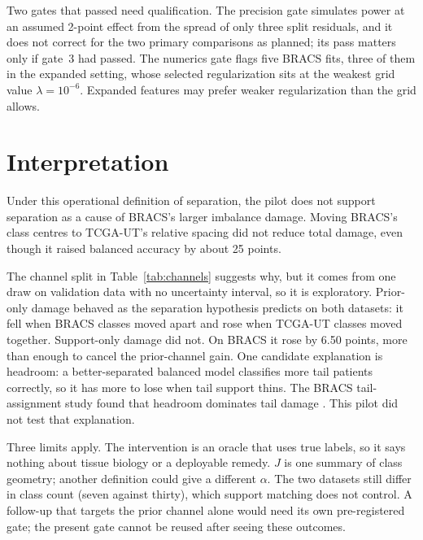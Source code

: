 \documentclass[11pt]{article}
\begin{document}
\noindent Two gates that passed need qualification. The precision gate simulates power at an assumed 2-point effect from the spread of only three split residuals, and it does not correct for the two primary comparisons as planned; its pass matters only if gate~3 had passed. The numerics gate flags five BRACS fits, three of them in the expanded setting, whose selected regularization sits at the weakest grid value $\lambda = 10^{-6}$. Expanded features may prefer weaker regularization than the grid allows.

\section{Interpretation}
\label{sec:interpretation}
Under this operational definition of separation, the pilot does not support separation as a cause of BRACS's larger imbalance damage. Moving BRACS's class centres to TCGA-UT's relative spacing did not reduce total damage, even though it raised balanced accuracy by about 25 points.

The channel split in Table~\ref{tab:channels} suggests why, but it comes from one draw on validation data with no uncertainty interval, so it is exploratory. Prior-only damage behaved as the separation hypothesis predicts on both datasets: it fell when BRACS classes moved apart and rose when TCGA-UT classes moved together. Support-only damage did not. On BRACS it rose by 6.50 points, more than enough to cancel the prior-channel gain. One candidate explanation is headroom: a better-separated balanced model classifies more tail patients correctly, so it has more to lose when tail support thins. The BRACS tail-assignment study found that headroom dominates tail damage \citep{queisler2026tailBracs}. This pilot did not test that explanation.

Three limits apply. The intervention is an oracle that uses true labels, so it says nothing about tissue biology or a deployable remedy. $J$ is one summary of class geometry; another definition could give a different $\alpha$. The two datasets still differ in class count (seven against thirty), which support matching does not control. A follow-up that targets the prior channel alone would need its own pre-registered gate; the present gate cannot be reused after seeing these outcomes.



\end{document}
